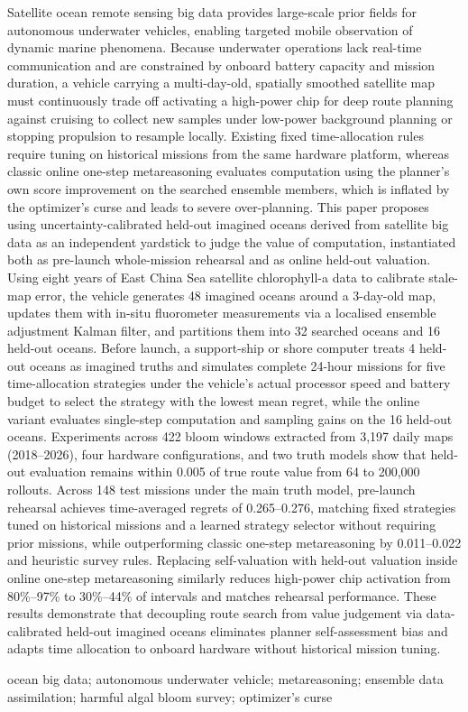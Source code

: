  Satellite ocean remote sensing big data provides large-scale prior fields for autonomous underwater vehicles, enabling targeted mobile observation of dynamic marine phenomena. Because underwater operations lack real-time communication and are constrained by onboard battery capacity and mission duration, a vehicle carrying a multi-day-old, spatially smoothed satellite map must continuously trade off activating a high-power chip for deep route planning against cruising to collect new samples under low-power background planning or stopping propulsion to resample locally. Existing fixed time-allocation rules require tuning on historical missions from the same hardware platform, whereas classic online one-step metareasoning evaluates computation using the planner's own score improvement on the searched ensemble members, which is inflated by the optimizer's curse and leads to severe over-planning. This paper proposes using uncertainty-calibrated held-out imagined oceans derived from satellite big data as an independent yardstick to judge the value of computation, instantiated both as pre-launch whole-mission rehearsal and as online held-out valuation. Using eight years of East China Sea satellite chlorophyll-a data to calibrate stale-map error, the vehicle generates 48 imagined oceans around a 3-day-old map, updates them with in-situ fluorometer measurements via a localised ensemble adjustment Kalman filter, and partitions them into 32 searched oceans and 16 held-out oceans. Before launch, a support-ship or shore computer treats 4 held-out oceans as imagined truths and simulates complete 24-hour missions for five time-allocation strategies under the vehicle's actual processor speed and battery budget to select the strategy with the lowest mean regret, while the online variant evaluates single-step computation and sampling gains on the 16 held-out oceans. Experiments across 422 bloom windows extracted from 3,197 daily maps (2018--2026), four hardware configurations, and two truth models show that held-out evaluation remains within 0.005 of true route value from 64 to 200,000 rollouts. Across 148 test missions under the main truth model, pre-launch rehearsal achieves time-averaged regrets of 0.265--0.276, matching fixed strategies tuned on historical missions and a learned strategy selector without requiring prior missions, while outperforming classic one-step metareasoning by 0.011--0.022 and heuristic survey rules. Replacing self-valuation with held-out valuation inside online one-step metareasoning similarly reduces high-power chip activation from 80\%--97\% to 30\%--44\% of intervals and matches rehearsal performance. These results demonstrate that decoupling route search from value judgement via data-calibrated held-out imagined oceans eliminates planner self-assessment bias and adapts time allocation to onboard hardware without historical mission tuning.

\vspace{4pt}
 ocean big data; autonomous underwater vehicle; metareasoning; ensemble data assimilation; harmful algal bloom survey; optimizer's curse
